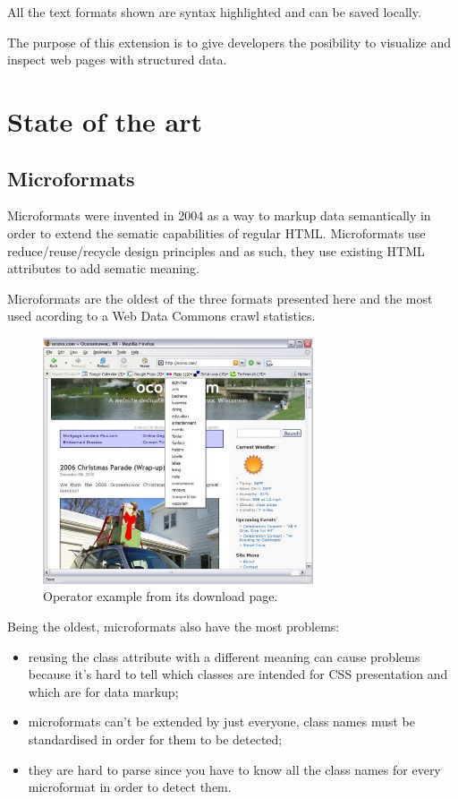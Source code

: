 \documentclass[12pt]{article}
\begin{document}
All the text formats shown are syntax highlighted and can be saved locally.

The purpose of this extension is to give developers the posibility to visualize
and inspect web pages with structured data.

\section{State of the art}

\subsection{Microformats}

Microformats were invented in 2004\cite{ufHist} as a way to markup data
semantically in order to extend the sematic capabilities of regular HTML.
Microformats use reduce/reuse/recycle design principles and as such, they use
existing HTML attributes to add sematic meaning\cite{ufWiki}.

Microformats are the oldest of the three formats presented here and the most
used acording to a Web Data Commons crawl statistics\cite{ufStat}.

\begin{figure}[b!]
    \centering
    \includegraphics[width=8cm]{uf-operator}
    \caption{Operator example from its download page.}
\end{figure}


Being the oldest, microformats also have the most problems:
\begin{itemize}
    \item reusing the class attribute with a different meaning can cause
    problems because it's hard to tell which classes are intended for CSS
    presentation and which are for data markup;
    \item microformats can't be extended by just everyone, class names must be
    standardised in order for them to be detected;
    \item they are hard to parse since you have to know all the class names for
    every microformat in order to detect them.
\end{itemize}
\end{document}
